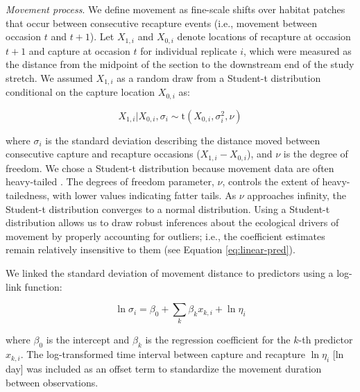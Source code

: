 \documentclass[11pt, class=article, crop=false]{standalone}
\begin{document}
\textit{Movement process}. We define movement as fine-scale shifts over habitat patches that occur between consecutive recapture events (i.e., movement between occasion $t$ and $t+1$). Let $X_{1,i}$ and $X_{0,i}$ denote locations of recapture at occasion $t+1$ and capture at occasion $t$ for individual replicate $i$, which were measured as the distance from the midpoint of the section to the downstream end of the study stretch. We assumed $X_{1,i}$ as a random draw from a Student-t distribution conditional on the capture location $X_{0,i}$ as:    

\begin{equation}
    X_{1, i}|X_{0, i}, \sigma_i \sim \text{t}(X_{0, i}, \sigma_i^2, \nu)
    \label{eq:student-t}
\end{equation}

where $\sigma_i$ is the standard deviation describing the distance moved between consecutive capture and recapture occasions ($X_{1,i} - X_{0,i}$), and $\nu$ is the degree of freedom.
We chose a Student-t distribution because movement data are often heavy-tailed \citep{clobertDispersalEcologyEvolution2012}.
The degrees of freedom parameter, $\nu$, controls the extent of heavy-tailedness, with lower values indicating fatter tails. As $\nu$ approaches infinity, the Student-t distribution converges to a normal distribution.
Using a Student-t distribution allows us to draw robust inferences about the ecological drivers of movement by properly accounting for outliers; i.e., the coefficient estimates remain relatively insensitive to them (see Equation \ref{eq:linear-pred}).

We linked the standard deviation of  movement distance to predictors using a log-link function: 

\begin{equation}
    \ln \sigma_i = \beta_0 + \sum_{k} \beta_k x_{k,i} + \ln \eta_i
    \label{eq:linear-pred}
\end{equation}

where $\beta_0$ is the intercept and $\beta_k$ is the regression coefficient for the $k$-th predictor $x_{k,i}$. The log-transformed time interval between capture and recapture $\ln \eta_i$ [ln day] was included as an offset term to standardize the movement duration between observations.
\end{document}
